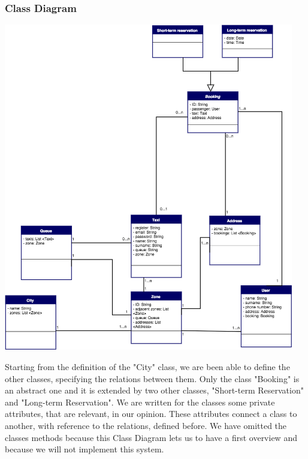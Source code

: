 \subsubsection{Class Diagram}
\begin{center}

\includegraphics[width=0.95\textwidth]{./images/ClassDiagram.png}
	\end{center}
	
Starting from the definition of the "City" class, we are been able to define the other classes, specifying the relations between them. Only the class "Booking" is an abstract one and it is extended by two other classes, "Short-term Reservation" and "Long-term Reservation".
We are written for the classes some private attributes, that are relevant, in our opinion. These attributes connect a class to another, with reference to the relations, defined before. 
We have omitted the classes methods because this Class Diagram lets us to have a first overview and because we will not implement this system.